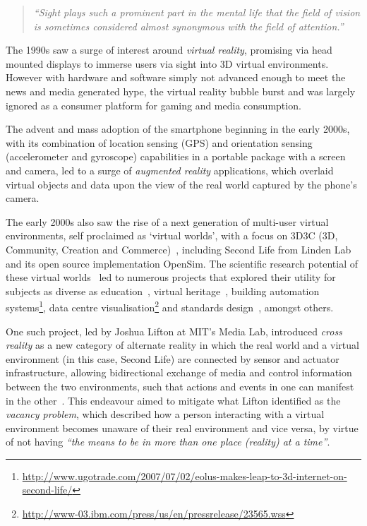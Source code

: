 \begin{quote}
	\textit{``Sight plays such a prominent part in the mental life that the field of vision is sometimes considered almost synonymous with the field of attention.''}~\cite{Lucas1951}
\end{quote}

The 1990s saw a surge of interest around \textit{virtual reality}, promising via head mounted displays to immerse users via sight into 3D virtual environments. However with hardware and software simply not advanced enough to meet the news and media generated hype, the virtual reality bubble burst and was largely ignored as a consumer platform for gaming and media consumption.

The advent and mass adoption of the smartphone beginning in the early 2000s, with its combination of location sensing (GPS) and orientation sensing (accelerometer and gyroscope) capabilities in a portable package with a screen and camera, led to a surge of \textit{augmented reality} applications, which overlaid virtual objects and data upon the view of the real world captured by the phone's camera.

The early 2000s also saw the rise of a next generation of multi-user virtual environments, self proclaimed as `virtual worlds', with a focus on 3D3C (3D, Community, Creation and Commerce)~\cite{Sevan2008}, including Second Life from Linden Lab and its open source implementation OpenSim. The scientific research potential of these virtual worlds~\cite{Bainbridge2007} led to numerous projects that explored their utility for subjects as diverse as education~\cite{Allison2012}, virtual heritage~\cite{Kennedy2013}, building automation systems\footnote{\url{http://www.ugotrade.com/2007/07/02/eolus-makes-leap-to-3d-internet-on-second-life/}}, data centre visualisation\footnote{\url{http://www-03.ibm.com/press/us/en/pressrelease/23565.wss}} and standards design~\cite{Gelissen2011a}, amongst others.

One such project, led by Joshua Lifton at MIT's Media Lab, introduced \textit{cross reality} as a new category of alternate reality in which the real world and a virtual environment (in this case, Second Life) are connected by sensor and actuator infrastructure, allowing bidirectional exchange of media and control information between the two environments, such that actions and events in one can manifest in the other~\cite{Lifton2007a}. This endeavour aimed to mitigate what Lifton identified as the \textit{vacancy problem}, which described how a person interacting with a virtual environment becomes unaware of their real environment and vice versa, by virtue of not having \textit{``the means to be in more than one place (reality) at a time''}.

